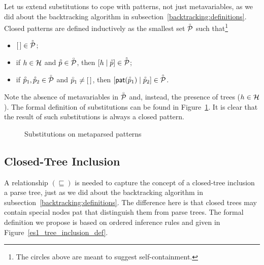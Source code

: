 Let us extend substitutions to cope with patterns, not just
meta\-variables, as we did about the back\-tracking algorithm in
sub\-section~\ref{backtracking:definitions}. Closed patterns are
defined inductively as the smallest set \(\accentset{\circ}{\cal P}\) such
that\footnote{The circles above are meant to suggest
  self\hyp{}containment.}
\begin{itemize}

  \item \([\,] \in \accentset{\circ}{\cal P}\);

  \item if \(h \in {\cal H}\) and \(\accentset{\circ}{p} \in \accentset{\circ}{\cal P}\),
        then \([{h}\mid{\accentset{\circ}{p}}] \in \accentset{\circ}{\cal P}\);

  \item if \(\accentset{\circ}{p}_1, \accentset{\circ}{p}_2 \in \accentset{\circ}{\cal P}\) and
    \(\accentset{\circ}{p}_1 \neq [\,]\), then
    \([{\textsf{pat}(\accentset{\circ}{p}_1)}\mid{\accentset{\circ}{p}_2}] \in \accentset{\circ}{\cal P}\).

\end{itemize}
Note the absence of meta\-variables in \(\accentset{\circ}{\cal P}\) and,
instead, the presence of trees (\(h \in {\cal H}\)). The formal
definition of substitutions can be found in
Figure~\ref{es1_subst_def}. It is clear that the result of such
substitutions is always a closed pattern.
\begin{figure}[H]
\caption{Substitutions on meta\-parsed patterns%
\label{es1_subst_def}}
\end{figure}


\subsection{Closed\hyp{}Tree Inclusion}

A relationship \((\sqsubseteq)\) is needed to capture the concept of a
closed\hyp{}tree inclusion a parse tree, just as we did about the
backtracking algorithm in
sub\-section~\ref{backtracking:definitions}. The difference here is
that closed trees may contain special nodes \textsf{pat} that
distinguish them from parse trees. The formal definition we propose is
based on ordered inference rules and given in
Figure~\ref{es1_tree_inclusion_def}.

